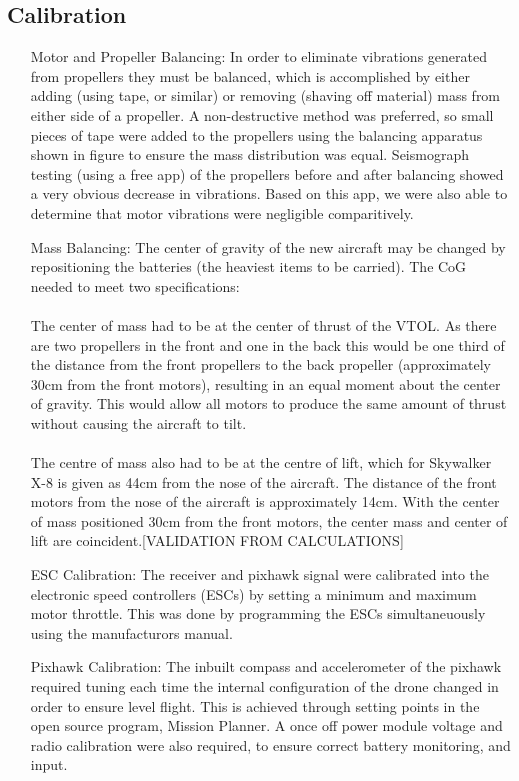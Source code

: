 \subsection{Calibration}
\begin{itemize}
	\item[Motor and Propeller Balancing:] In order to eliminate vibrations generated from propellers they must be balanced, which is accomplished by either adding (using tape, or similar) or removing (shaving off material) mass from either side of a propeller. A non-destructive method was preferred, so small pieces of tape were added to the propellers using the balancing apparatus shown in figure  to ensure the mass distribution was equal.  Seismograph testing (using a free app) of the propellers before and after balancing showed a very obvious decrease in vibrations. Based on this app, we were also able to determine that motor vibrations were negligible comparitively.
	\item[Mass Balancing:]  The center of gravity of the new aircraft may be changed by repositioning the batteries (the heaviest items to be carried). The CoG needed to meet two specifications:
	\\\\The center of mass had to be at the center of thrust of the VTOL. As there are two propellers in the front and one in the back this would be one third of the distance from the front propellers to the back propeller (approximately 30cm from the front motors), resulting in an equal moment about the center of gravity. This would allow all motors to produce the same amount of thrust without causing the aircraft to tilt.
	\\\\The centre of mass also had to be at the centre of lift, which for Skywalker X-8 is given as 44cm from the nose of the aircraft. The distance of the front motors from the nose of the aircraft is approximately 14cm. With the center of mass positioned 30cm from the front motors, the center mass and center of lift are coincident.[VALIDATION FROM CALCULATIONS]
	\item[ESC Calibration:] The receiver and pixhawk signal were calibrated into the electronic speed controllers (ESCs) by setting a minimum and maximum motor throttle. This was done by programming the ESCs simultaneuously using the manufacturors manual. 
	\item[Pixhawk Calibration:] The inbuilt compass and accelerometer of the pixhawk required tuning each time the internal configuration of the drone changed in order to ensure level flight. This is achieved through setting points in the open source program, Mission Planner. A once off power module voltage and radio calibration were also required, to ensure correct battery monitoring, and input. 

\end{itemize}
